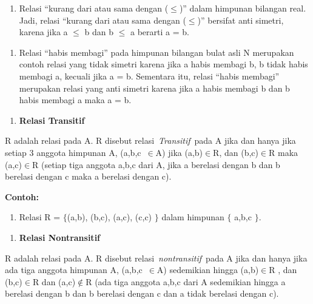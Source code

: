 \documentclass[11pt,fleqn]{book} %
\begin{document}
\begin{enumerate}
\item  Relasi ``kurang dari atau sama dengan ($\mathrm{\le}$)'' dalam himpunan bilangan real. Jadi, relasi ``kurang dari atau sama dengan ($\mathrm{\le}$)'' bersifat anti simetri, karena jika a $\mathrm{\le}$ b dan b $\mathrm{\le}$ a berarti a = b.
\end{enumerate}

\noindent 

\begin{enumerate}
\item  Relasi ``habis membagi'' pada himpunan bilangan bulat asli N merupakan contoh relasi yang tidak simetri karena jika a habis membagi b, b tidak habis membagi a, kecuali jika a = b. Sementara itu, relasi ``habis membagi'' merupakan relasi yang anti simetri karena jika a habis membagi b dan b habis membagi a maka a = b.
\end{enumerate}

\noindent 

\begin{enumerate}
\item  \textbf{Relasi Transitif}
\end{enumerate}

\noindent 

\noindent R adalah relasi pada A. R disebut relasi~\textit{Transitif}~pada A jika dan hanya jika setiap 3 anggota himpunan A, (a,b,c~$\mathrm{\in }$A) jika (a,b)$\mathrm{\in }$R, dan (b,c)$\mathrm{\in }$R maka (a,c)$\mathrm{\in }$R (setiap tiga anggota a,b,c dari A, jika a berelasi dengan b dan b berelasi dengan c maka a berelasi dengan c).

\noindent \textbf{}

\noindent \textbf{Contoh:}

\begin{enumerate}
\item  Relasi R = $\{$(a,b), (b,c), (a,c), (c,c) $\}$ dalam himpunan $\{$ a,b,c $\}$.
\end{enumerate}

\noindent 

\begin{enumerate}
\item  \textbf{Relasi Nontransitif}
\end{enumerate}

\noindent 

\noindent R adalah relasi pada A. R disebut relasi~\textit{nontransitif}~pada A jika dan hanya jika ada tiga anggota himpunan A, (a,b,c~$\mathrm{\in }$A) sedemikian hingga (a,b)$\mathrm{\in }$R , dan (b,c)$\mathrm{\in }$R dan (a,c)$\mathrm{\notin }$R (ada tiga anggota a,b,c dari A sedemikian hingga a berelasi dengan b dan b berelasi dengan c dan a tidak berelasi dengan c).
\end{document}
